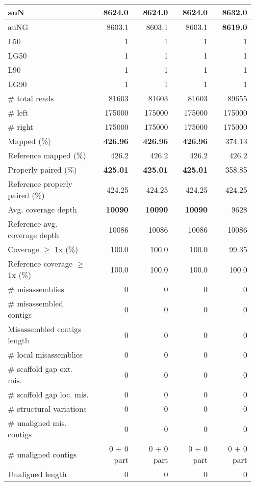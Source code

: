 \documentclass[12pt,a4paper]{article}
\begin{document}
\begin{table}[ht]
\begin{center}
\begin{tabular}{|l*{4}{|r}|}
auN & 8624.0 & 8624.0 & 8624.0 & {\bf 8632.0} \\ \hline
auNG & 8603.1 & 8603.1 & 8603.1 & {\bf 8619.0} \\ \hline
L50 & 1 & 1 & 1 & 1 \\ \hline
LG50 & 1 & 1 & 1 & 1 \\ \hline
L90 & 1 & 1 & 1 & 1 \\ \hline
LG90 & 1 & 1 & 1 & 1 \\ \hline
\# total reads & 81603 & 81603 & 81603 & 89655 \\ \hline
\# left & 175000 & 175000 & 175000 & 175000 \\ \hline
\# right & 175000 & 175000 & 175000 & 175000 \\ \hline
Mapped (\%) & {\bf 426.96} & {\bf 426.96} & {\bf 426.96} & 374.13 \\ \hline
Reference mapped (\%) & 426.2 & 426.2 & 426.2 & 426.2 \\ \hline
Properly paired (\%) & {\bf 425.01} & {\bf 425.01} & {\bf 425.01} & 358.85 \\ \hline
Reference properly paired (\%) & 424.25 & 424.25 & 424.25 & 424.25 \\ \hline
Avg. coverage depth & {\bf 10090} & {\bf 10090} & {\bf 10090} & 9628 \\ \hline
Reference avg. coverage depth & 10086 & 10086 & 10086 & 10086 \\ \hline
Coverage $\geq$ 1x (\%) & 100.0 & 100.0 & 100.0 & 99.35 \\ \hline
Reference coverage $\geq$ 1x (\%) & 100.0 & 100.0 & 100.0 & 100.0 \\ \hline
\# misassemblies & 0 & 0 & 0 & 0 \\ \hline
\# misassembled contigs & 0 & 0 & 0 & 0 \\ \hline
Misassembled contigs length & 0 & 0 & 0 & 0 \\ \hline
\# local misassemblies & 0 & 0 & 0 & 0 \\ \hline
\# scaffold gap ext. mis. & 0 & 0 & 0 & 0 \\ \hline
\# scaffold gap loc. mis. & 0 & 0 & 0 & 0 \\ \hline
\# structural variations & 0 & 0 & 0 & 0 \\ \hline
\# unaligned mis. contigs & 0 & 0 & 0 & 0 \\ \hline
\# unaligned contigs & 0 + 0 part & 0 + 0 part & 0 + 0 part & 0 + 0 part \\ \hline
Unaligned length & 0 & 0 & 0 & 0 \\ \hline

\end{tabular}
\end{center}
\end{table}
\end{document}
